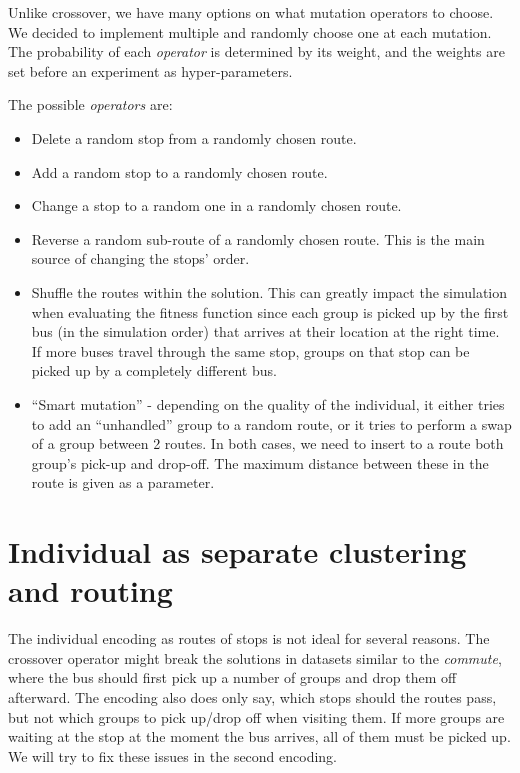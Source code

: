 Unlike crossover, we have many options on what mutation operators to choose. We decided to implement multiple and randomly choose one at each mutation. The probability of each \textit{operator} is determined by its weight, and the weights are set before an experiment as hyper-parameters.

The possible \textit{operators} are:
\begin{itemize}
    \setlength\itemsep{0pt}
    \item Delete a random stop from a randomly chosen route.
    \item Add a random stop to a randomly chosen route.
    \item Change a stop to a random one in a randomly chosen route.
    \item Reverse a random sub-route of a randomly chosen route. This is the main source of changing the stops' order.
    \item Shuffle the routes within the solution. This can greatly impact the simulation when evaluating the fitness function since each group is picked up by the first bus (in the simulation order) that arrives at their location at the right time. If more buses travel through the same stop, groups on that stop can be picked up by a completely different bus.
    \item ``Smart mutation'' - depending on the quality of the individual, it either tries to add an ``unhandled'' group to a random route, or it tries to perform a swap of a group between 2 routes. In both cases, we need to insert to a route both group's pick-up and drop-off. The maximum distance between these in the route is given as a parameter.
\end{itemize}

\section{Individual as separate clustering and routing}\label{sec:evocr}

The individual encoding as routes of stops is not ideal for several reasons. The crossover operator might break the solutions in datasets similar to the \textit{commute}, where the bus should first pick up a number of groups and drop them off afterward. The encoding also does only say, which stops should the routes pass, but not which groups to pick up/drop off when visiting them. If more groups are waiting at the stop at the moment the bus arrives, all of them must be picked up. We will try to fix these issues in the second encoding.

